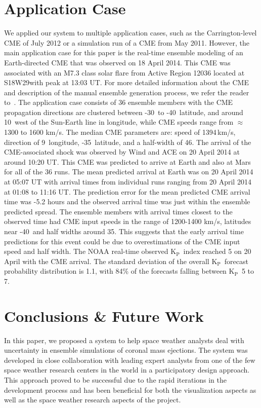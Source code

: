 \documentclass[journal]{vgtc}                %
\newcommand{\kpIndex}{$\textrm{K}_\textrm{P}$}
\begin{document}
\section{Application Case} \label{sec:applicationcase}
We applied our system to multiple application cases, such as the Carrington-level CME of July 2012 or a simulation run of a CME from May 2011. However, the main application case for this paper is the real-time ensemble modeling of an Earth-directed CME that was observed on 18 April 2014. This CME was associated with an M7.3 class solar flare from Active Region 12036 located at S18\degree W29\degree with peak at 13:03 UT. For more detailed information about the CME and description of the manual ensemble generation process, we refer the reader to~\cite{mays2015ensemble}. The application case consists of 36 ensemble members with the CME propagation directions are clustered between -30\degree\ to -40\degree\ latitude, and around 10\degree\ west of the Sun-Earth line in longitude, while CME speeds range from $\approx$1300 to 1600 km/s. The median CME parameters are: speed of 1394\,km/s, direction of 9\degree\ longitude, -35\degree\ latitude, and a half-width of 46\degree . The arrival of the CME-associated shock was observed by Wind and ACE on 20 April 2014 at around 10:20 UT. This CME was predicted to arrive at Earth and also at Mars for all of the 36 runs. The mean predicted arrival at Earth was on 20 April 2014 at 05:07 UT with arrival times from individual runs ranging from 20 April 2014 at 01:08 to 11:16 UT. The prediction error for the mean predicted CME arrival time was -5.2 hours and the observed arrival time was just within the ensemble predicted spread. The ensemble members with arrival times closest to the observed time had CME input speeds in the range of 1200-1400 km/s, latitudes near -40\degree\ and half widths around 35\degree . This suggests that the early arrival time predictions for this event could be due to overestimations of the CME input speed and half width. The NOAA real-time observed \kpIndex\ index reached 5 on 20 April with the CME arrival. The standard deviation of the overall \kpIndex\ forecast probability distribution is 1.1, with 84\% of the forecasts falling between \kpIndex\ 5 to 7.

\section{Conclusions \& Future Work} \label{sec:futurework}
In this paper, we proposed a system to help space weather analysts deal with uncertainty in ensemble simulations of coronal mass ejections. The system was developed in close collaboration with leading expert analysts from one of the few space weather research centers in the world in a participatory design approach. This approach proved to be successful due to the rapid iterations in the development process and has been beneficial for both the visualization aspects as well as the space weather research aspects of the project.
\end{document}
